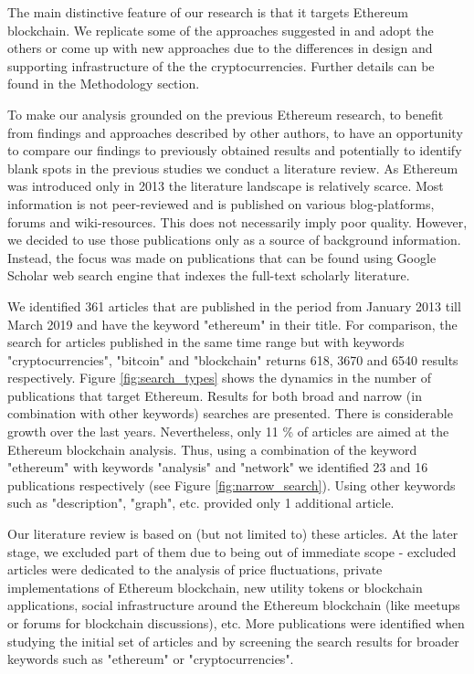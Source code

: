 The main distinctive feature of our research is that it targets Ethereum blockchain.
We replicate some of the approaches suggested in \cite{lischke2016analyzing} and adopt the others or come up with new approaches due to the differences in design and supporting infrastructure of the the cryptocurrencies.
Further details can be found in the Methodology section.

To make our analysis grounded on the previous Ethereum research, to benefit from findings and approaches described by other authors, to have an opportunity to compare our findings to previously obtained results and potentially to identify blank spots in the previous studies we conduct a literature review. 
As Ethereum was introduced only in 2013 the literature landscape is relatively scarce.
Most information is not peer-reviewed and is published on various blog-platforms, forums and wiki-resources.
This does not necessarily imply poor quality.
However, we decided to use those publications only as a source of background information.
Instead, the focus was made on publications that can be found using Google Scholar web search engine that indexes the full-text scholarly literature.

We identified 361 articles that are published in the period from January 2013 till March 2019 and have the keyword "ethereum" in their title. 
For comparison, the search for articles published in the same time range but with keywords "cryptocurrencies", "bitcoin" and "blockchain" returns 618, 3670 and 6540 results respectively.
Figure \ref{fig:search_types} shows the dynamics in the number of publications that target Ethereum. 
Results for both broad and narrow (in combination with other keywords) searches are presented.
There is considerable growth over the last years.
Nevertheless, only 11 \% of articles are aimed at the Ethereum blockchain analysis.
Thus, using a combination of the keyword "ethereum" with keywords "analysis" and "network" we identified 23 and 16 publications respectively (see Figure \ref{fig:narrow_search}).
Using other keywords such as "description", "graph", etc. provided only 1 additional article. 


Our literature review is based on (but not limited to) these articles.
At the later stage, we excluded part of them due to being out of immediate scope - excluded articles were dedicated to the analysis of price fluctuations, private implementations of Ethereum blockchain, new utility tokens or blockchain applications, social infrastructure around the Ethereum blockchain (like meetups or forums for blockchain discussions), etc.
More publications were identified when studying the initial set of articles and by screening the search results for broader keywords such as "ethereum" or "cryptocurrencies".

